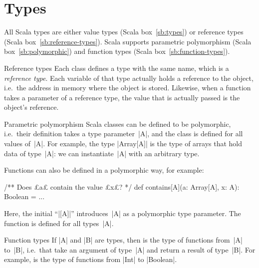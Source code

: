 \section{Types}
\label{sec:scala-types}

All Scala types are either value types (Scala box~\ref{sb:types}) or reference
types (Scala box~\ref{sb:reference-types}).  Scala supports parametric
polymorphism (Scala box~\ref{sb:polymorphic}) and function types (Scala
box~\ref{sb:function-types}).


\begin{scalaBox}{Reference types}
\label{sb:reference-types}
Each class defines a type with the same name, which is a \emph{reference
  type}.  Each variable of that type actually holds a reference to the object,
i.e.~the address in memory where the object is stored.  
Likewise, when a function takes a parameter
of a reference type, the value that is actually passed is the object's
reference.
\end{scalaBox}


\begin{scalaBox}{Parametric polymorphism}
\label{sb:polymorphic}
Scala classes can be defined to be polymorphic, i.e.~their definition takes a
type parameter~|A|, and the class is defined for all values of~|A|.  For
example, the type |Array[A]| is the type of arrays that hold data of type~|A|:
we can instantiate~|A| with an arbitrary type.

Functions can also be defined in a polymorphic way, for example:
\begin{scala}
  /** Does £a£ contain the value £x£? */
  def contains[A](a: Array[A], x: A): Boolean = ...
\end{scala}
%
Here, the initial ``|[A]|'' introduces~|A| as a polymorphic type parameter.
The function is defined for all types~|A|. 
\end{scalaBox}


\begin{scalaBox}{Function types}
\label{sb:function-types}
If |A| and |B| are types, then  is the type of functions
from~|A| to~|B|, i.e.~that take an argument of type~|A| and return a result of
type~|B|.  For example,  is the type of functions from
|Int| to |Boolean|.
\end{scalaBox}

